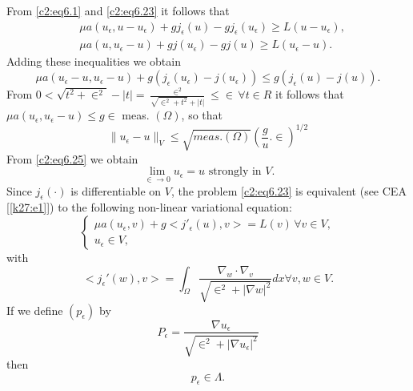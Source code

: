 From \eqref{c2:eq6.1} and \eqref{c2:eq6.23} it follows that 
\begin{align*}
& \mu a (u_\epsilon , u - u_\epsilon ) + gj_\epsilon (u) -
  gj_\epsilon (u_\epsilon ) \geq L (u - u_\epsilon ),\\ 
&\mu a (u, u_\epsilon - u) + gj (u_\epsilon ) -gj (u) \geq L
  (u_\epsilon - u).  
\end{align*}
Adding these inequalities we obtain
\begin{equation}
\mu a (u_\epsilon - u, u_\epsilon - u) + g (j_\epsilon 
(u_\epsilon ) - j(u_\epsilon )) \leq g (j_\epsilon (u) -
j(u)). \tag{6.24}\label{c2:eq6.24} 
\end{equation}
From $0 < \sqrt{t^2 + \in^2} - |t| =
\frac{\in^2}{\sqrt{\in^2 + t^2 }+ |t|} \leq
\in\, \forall  t \in R$ it follows that $\mu a
(u_\epsilon , u_\epsilon - u) \leq g \in$
meas. $(\Omega)$, so that  
\begin{equation}
\parallel  u_\epsilon - u \parallel_V \leq \sqrt{meas. (\Omega)}
(\frac{g}{u}. \in )^{1/2}\tag{6.25}\label{c2:eq6.25} 
\end{equation}
From \eqref{c2:eq6.25} we obtain
\begin{equation}
\lim_{ \in \to 0} u_\epsilon = u \text{ strongly  in }
V. \tag{6.26}\label{c2:eq6.26} 
\end{equation}
Since $j_\epsilon (\cdot)$ is differentiable on $V$, the problem
\eqref{c2:eq6.23} is equivalent (see CEA [\ref{k27:e1}]) to the following non-linear
variational equation: 
\begin{equation}
\begin{cases}
\mu a (u_\epsilon , v) + g < j'_\epsilon (u), v > = L (v)\, \forall 
v \in V,\\ 
u_\epsilon \in V, 
\end{cases}
\tag{6.27}\label{c2:eq6.27}
\end{equation}\pageoriginale 
with 
\begin{equation}
<j_\epsilon ' (w), v> = \int_\Omega \frac{\nabla_w \cdot
  \nabla_v}{\sqrt{\in^2 + |\nabla w |^2}} dx
\forall v, w \in V. \tag{6.28}\label{c2:eq6.28} 
\end{equation}
If we define $(p_\epsilon )$ by 
\begin{equation}
P_\epsilon = \frac{\nabla u_\epsilon }{\sqrt{\in^2
    + |\nabla u_\epsilon |^2}} \tag{6.29}\label{c2:eq6.29} 
\end{equation}
then 
\begin{equation}
p_\epsilon \in \Lambda. \tag{6.30}\label{c2:eq6.30}
\end{equation}
